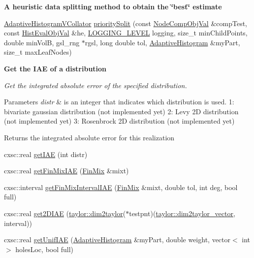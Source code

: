 \begin{Indent}{\bf \-A heuristic data splitting method to obtain the \char`\"{}best\char`\"{} estimate}
\begin{DoxyCompactItemize}
\item 
\hyperlink{classsubpavings_1_1AdaptiveHistogramVCollator}{\-Adaptive\-Histogram\-V\-Collator} \hyperlink{classsubpavings_1_1AdaptiveHistogramValidation_a9a558b6a13ad7019acd893f0edbb107b}{priority\-Split} (const \hyperlink{classsubpavings_1_1NodeCompObjVal}{\-Node\-Comp\-Obj\-Val} \&comp\-Test, const \hyperlink{classsubpavings_1_1HistEvalObjVal}{\-Hist\-Eval\-Obj\-Val} \&he, \hyperlink{namespacesubpavings_aef8e51096b59ecaf1a1e9b2ee24b6089}{\-L\-O\-G\-G\-I\-N\-G\-\_\-\-L\-E\-V\-E\-L} logging, size\-\_\-t min\-Child\-Points, double min\-Vol\-B, gsl\-\_\-rng $\ast$rgsl, long double tol, \hyperlink{classsubpavings_1_1AdaptiveHistogram}{\-Adaptive\-Histogram} \&my\-Part, size\-\_\-t max\-Leaf\-Nodes)
\end{DoxyCompactItemize}
\end{Indent}
\begin{Indent}{\bf \-Get the \-I\-A\-E of a distribution}\par
{\em \-Get the integrated absolute error of the specified distribution. 
\begin{DoxyParams}{\-Parameters}
{\em distr} & is an integer that indicates which distribution is used. 1\-: bivariate gaussian distribution (not implemented yet) 2\-: \-Levy 2\-D distribution (not implemented yet) 3\-: \-Rosenbrock 2\-D distribution (not implemented yet) \\
\hline
\end{DoxyParams}
\begin{DoxyReturn}{\-Returns}
the integrated absolute error for this realization 
\end{DoxyReturn}
}\begin{DoxyCompactItemize}
\item 
cxsc\-::real \hyperlink{classsubpavings_1_1AdaptiveHistogramValidation_ae599e0bbb226dc0610c4ec25845533d8}{get\-I\-A\-E} (int distr)
\item 
cxsc\-::real \hyperlink{classsubpavings_1_1AdaptiveHistogramValidation_a034c61becd57f5d282435f5881950035}{get\-Fin\-Mix\-I\-A\-E} (\hyperlink{structFinMix}{\-Fin\-Mix} \&mixt)
\item 
cxsc\-::interval \hyperlink{classsubpavings_1_1AdaptiveHistogramValidation_aa8b89b93450dea8e464eac31d67c78d1}{get\-Fin\-Mix\-Interval\-I\-A\-E} (\hyperlink{structFinMix}{\-Fin\-Mix} \&mixt, double tol, int deg, bool full)
\item 
cxsc\-::real \hyperlink{classsubpavings_1_1AdaptiveHistogramValidation_ab032205bb13623930c84ff142f565ac5}{get2\-D\-I\-A\-E} (\hyperlink{classtaylor_1_1dim2taylor}{taylor\-::dim2taylor}($\ast$testpnt)(\hyperlink{classtaylor_1_1dim2taylor__vector}{taylor\-::dim2taylor\-\_\-vector}, interval))
\item 
cxsc\-::real \hyperlink{classsubpavings_1_1AdaptiveHistogramValidation_aa54b166c50901dc9ec2976bb4a5df916}{get\-Unif\-I\-A\-E} (\hyperlink{classsubpavings_1_1AdaptiveHistogram}{\-Adaptive\-Histogram} \&my\-Part, double weight, vector$<$ int $>$ holes\-Loc, bool full)
\end{DoxyCompactItemize}
\end{Indent}

